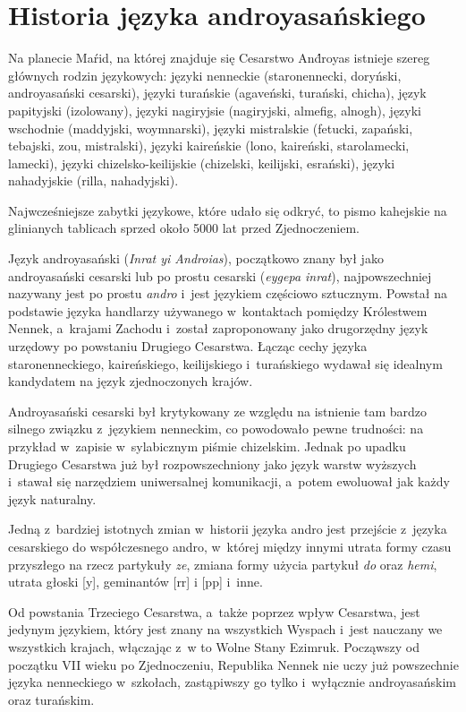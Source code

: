 \section[Historia]{Historia języka androyasańskiego}

\begin{spacing}{1.1}
Na planecie Maŕid, na której znajduje się Cesarstwo And́royas istnieje szereg 
głównych rodzin językowych: języki nenneckie (staronennecki, doryński, 
androyasański cesarski), języki turańskie (agaveński, turański, chicha), język 
papityjski (izolowany), języki nagiryjsie (nagiryjski, almefig, alnogh), 
języki wschodnie (maddyjski, woymnarski), języki mistralskie (fetucki, zapański, 
tebajski, zou, mistralski), języki kaireńskie (lono, kaireński, starolamecki, 
lamecki), języki chi\-zelsko-keilijskie (chizelski, keilijski, esrański), języki 
nahadyjskie (rilla, nahadyjski).

Najwcześniejsze zabytki językowe, które udało się odkryć, to pismo kahejskie na 
glinianych tablicach sprzed około 5000 lat przed Zjednoczeniem.

Język androyasański (\emph{Inrat yi Androias}), początkowo znany był jako 
androyasański cesarski lub po prostu cesarski (\emph{eygepa inrat}), 
najpowszechniej nazywany jest po prostu \emph{andro} i~jest językiem częściowo 
sztucznym. Powstał na podstawie języka handlarzy używanego w~kontaktach pomiędzy 
Królestwem Nennek, a~krajami Zachodu i~został zaproponowany jako drugorzędny 
język urzędowy po powstaniu Drugiego Cesarstwa. Łącząc cechy języka 
staronenneckiego, kaireńskiego, keilijskiego i~turańskiego wydawał się idealnym 
kandydatem na język zjednoczonych krajów.

Androyasański cesarski był krytykowany ze względu na istnienie tam bardzo 
silnego związku z~językiem nenneckim, co powodowało pewne trudności: na przykład 
w~zapisie w~sylabicznym piśmie chizelskim. Jednak po upadku Drugiego Cesarstwa 
już był rozpowszechniony jako język warstw wyższych i~stawał się narzędziem 
uniwersalnej komunikacji, a~potem ewoluował jak każdy język naturalny.

Jedną z~bardziej istotnych zmian w~historii języka andro jest przejście z~języka
cesarskiego do współczesnego andro, w~której między innymi utrata formy czasu
przyszłego na rzecz partykuły \emph{ze}, zmiana formy użycia partykuł \emph{do}
oraz \emph{hemi}, utrata głoski [y], geminantów [rr] i [pp] i~inne.

Od powstania Trzeciego Cesarstwa, a~także poprzez wpływ Cesarstwa, jest jedynym
językiem, który jest znany na wszystkich Wyspach i~jest nauczany we wszystkich
krajach, włączając z~w to Wolne Stany Ezimruk. Począwszy od początku VII wieku
po Zjednoczeniu, Republika Nennek nie uczy już powszechnie języka nenneckiego
w~szkołach, zastąpiwszy go tylko i~wyłącznie androyasańskim oraz turańskim.


\end{spacing}
